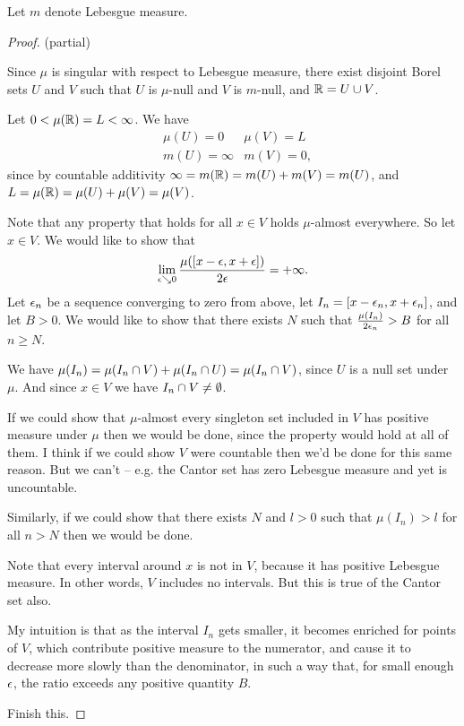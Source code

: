 Let $m$ denote Lebesgue measure.

\begin{proof}
   (partial)

  Since $\mu$ is singular with respect to Lebesgue measure, there exist disjoint Borel sets $U$ and $V$ such
  that $U$ is $\mu$-null and $V$ is $m$-null, and $\mathbb{R} = U \cup V$.

  Let $0 < \mu(\mathbb{R}) = L < \infty$. We have
  \begin{align*}
    &\mu(U) = 0     & \mu(V) = L \\
    &m(U) = \infty & m(V) = 0,
  \end{align*}
  since by countable additivity $\infty = m(\mathbb{R}) = m(U) + m(V) = m(U)$,
  and $L = \mu(\mathbb{R}) = \mu(U) + \mu(V) = \mu(V)$.

  Note that any property that holds for all $x \in V$ holds $\mu$-almost everywhere. So let $x \in V$. We would
  like to show that
  \begin{align*}
    \lim_{\eps \searrow 0} \frac{\mu([x - \eps, x + \eps])}{2\eps} = +\infty.
  \end{align*}
  Let $\epsilon_n$ be a sequence converging to zero from above, let $I_n = [x - \epsilon_n, x + \epsilon_n]$, and
  let $B > 0$. We would like to show that there exists $N$ such that $\frac{\mu(I_n)}{2\epsilon_n} > B$ for
  all $n \geq N$.

  We have $\mu(I_n) = \mu(I_n \cap V) + \mu(I_n \cap U) = \mu(I_n \cap V)$, since $U$ is a null set
  under $\mu$. And since $x \in V$ we have $I_n \cap V \neq \emptyset$.

  If we could show that $\mu$-almost every singleton set included in $V$ has positive measure under $\mu$ then
  we would be done, since the property would hold at all of them. I think if we could show $V$ were countable
  then we'd be done for this same reason. But we can't -- e.g. the Cantor set has zero Lebesgue measure and yet
  is uncountable.

  Similarly, if we could show that there exists $N$ and $l > 0$ such that $\mu(I_n) > l$ for all $n > N$ then
  we would be done.

  Note that every interval around $x$ is not in $V$, because it has positive Lebesgue measure. In other
  words, $V$ includes no intervals. But this is true of the Cantor set also.

  My intuition is that as the interval $I_n$ gets smaller, it becomes enriched for points of $V$, which
  contribute positive measure to the numerator, and cause it to decrease more slowly than the denominator, in
  such a way that, for small enough $\epsilon$, the ratio exceeds any positive quantity $B$.

   Finish this.
\end{proof}

